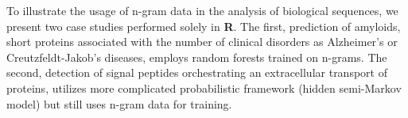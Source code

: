 \documentclass[11pt, a4paper]{article}
\begin{document}
To illustrate the usage of n-gram data in the analysis of biological
sequences, we present two case studies performed solely in \textbf{R}.
The first, prediction of amyloids, short proteins associated with the
number of clinical disorders as Alzheimer's or Creutzfeldt-Jakob's
diseases, employs random forests trained on n-grams. The second,
detection of signal peptides orchestrating an extracellular transport of
proteins, utilizes more complicated probabilistic framework (hidden
semi-Markov model) but still uses n-gram data for training.
\end{document}
